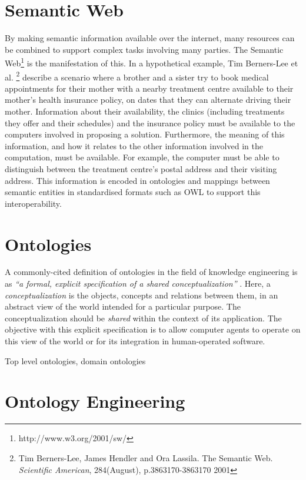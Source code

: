 \documentclass[a4paper]{report}
\begin{document}
\section{Semantic Web}

By making semantic information available over the internet, many resources can be combined to support complex tasks involving many parties.
The Semantic Web\footnote{http://www.w3.org/2001/sw/} is the manifestation of this.
In a hypothetical example, Tim Berners-Lee et al. \footnote{Tim Berners-Lee, James Hendler and Ora Lassila. The Semantic Web. \emph{Scientific American}, 284(August), p.3863170-3863170 2001} describe a scenario where a brother and a sister try to book medical appointments for their mother with a nearby treatment centre available to their mother's health insurance policy, on dates that they can alternate driving their mother.
Information about their availability, the clinics (including treatments they offer and their schedules) and the insurance policy must be available to the computers involved in proposing a solution.
Furthermore, the meaning of this information, and how it relates to the other information involved in the computation, must be available.
For example, the computer must be able to distinguish between the treatment centre's postal address and their visiting address.
This information is encoded in ontologies and mappings between semantic entities in standardised formats such as OWL\cite{OWLOverview2004} to support this interoperability.

\section{Ontologies}

A commonly-cited definition of ontologies in the field of knowledge engineering is as \emph{``a formal, explicit specification of a shared conceptualization''} \cite{StuderEtAl1998KEPM}.
Here, a \emph{conceptualization} is the objects, concepts and relations between them, in an abstract view of the world intended for a particular purpose.
The conceptualization should be \emph{shared} within the context of its application.
The objective with this explicit specification is to allow computer agents to operate on this view of the world or for its integration in human-operated software.

Top level ontologies, domain ontologies

\section{Ontology Engineering}
\end{document}
